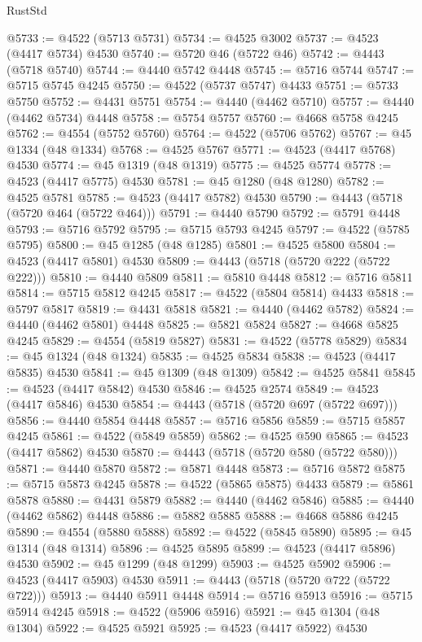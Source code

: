 \begin{lexlean}{RustStd}
\begin{coremodule}
{\begin{coremodule}
{{{{{{{{{{{{{{{{{{{{{{{{{{{{{{{{{{{{{{{{{{{{{{{{{{{{{{{{{{{{@5733 := @4522 (@5713 @5731)
@5734 := @4525 @3002
@5737 := @4523 (@4417 @5734) @4530
@5740 := @5720 @46 (@5722 @46)
@5742 := @4443 (@5718 @5740)
@5744 := @4440 @5742 @4448
@5745 := @5716 @5744
@5747 := @5715 @5745 @4245
@5750 := @4522 (@5737 @5747) @4433
@5751 := @5733 @5750
@5752 := @4431 @5751
@5754 := @4440 (@4462 @5710)
@5757 := @4440 (@4462 @5734) @4448
@5758 := @5754 @5757
@5760 := @4668 @5758 @4245
@5762 := @4554 (@5752 @5760)
@5764 := @4522 (@5706 @5762)
@5767 := @45 @1334 (@48 @1334)
@5768 := @4525 @5767
@5771 := @4523 (@4417 @5768) @4530
@5774 := @45 @1319 (@48 @1319)
@5775 := @4525 @5774
@5778 := @4523 (@4417 @5775) @4530
@5781 := @45 @1280 (@48 @1280)
@5782 := @4525 @5781
@5785 := @4523 (@4417 @5782) @4530
@5790 := @4443 (@5718 (@5720 @464 (@5722 @464)))
@5791 := @4440 @5790
@5792 := @5791 @4448
@5793 := @5716 @5792
@5795 := @5715 @5793 @4245
@5797 := @4522 (@5785 @5795)
@5800 := @45 @1285 (@48 @1285)
@5801 := @4525 @5800
@5804 := @4523 (@4417 @5801) @4530
@5809 := @4443 (@5718 (@5720 @222 (@5722 @222)))
@5810 := @4440 @5809
@5811 := @5810 @4448
@5812 := @5716 @5811
@5814 := @5715 @5812 @4245
@5817 := @4522 (@5804 @5814) @4433
@5818 := @5797 @5817
@5819 := @4431 @5818
@5821 := @4440 (@4462 @5782)
@5824 := @4440 (@4462 @5801) @4448
@5825 := @5821 @5824
@5827 := @4668 @5825 @4245
@5829 := @4554 (@5819 @5827)
@5831 := @4522 (@5778 @5829)
@5834 := @45 @1324 (@48 @1324)
@5835 := @4525 @5834
@5838 := @4523 (@4417 @5835) @4530
@5841 := @45 @1309 (@48 @1309)
@5842 := @4525 @5841
@5845 := @4523 (@4417 @5842) @4530
@5846 := @4525 @2574
@5849 := @4523 (@4417 @5846) @4530
@5854 := @4443 (@5718 (@5720 @697 (@5722 @697)))
@5856 := @4440 @5854 @4448
@5857 := @5716 @5856
@5859 := @5715 @5857 @4245
@5861 := @4522 (@5849 @5859)
@5862 := @4525 @590
@5865 := @4523 (@4417 @5862) @4530
@5870 := @4443 (@5718 (@5720 @580 (@5722 @580)))
@5871 := @4440 @5870
@5872 := @5871 @4448
@5873 := @5716 @5872
@5875 := @5715 @5873 @4245
@5878 := @4522 (@5865 @5875) @4433
@5879 := @5861 @5878
@5880 := @4431 @5879
@5882 := @4440 (@4462 @5846)
@5885 := @4440 (@4462 @5862) @4448
@5886 := @5882 @5885
@5888 := @4668 @5886 @4245
@5890 := @4554 (@5880 @5888)
@5892 := @4522 (@5845 @5890)
@5895 := @45 @1314 (@48 @1314)
@5896 := @4525 @5895
@5899 := @4523 (@4417 @5896) @4530
@5902 := @45 @1299 (@48 @1299)
@5903 := @4525 @5902
@5906 := @4523 (@4417 @5903) @4530
@5911 := @4443 (@5718 (@5720 @722 (@5722 @722)))
@5913 := @4440 @5911 @4448
@5914 := @5716 @5913
@5916 := @5715 @5914 @4245
@5918 := @4522 (@5906 @5916)
@5921 := @45 @1304 (@48 @1304)
@5922 := @4525 @5921
@5925 := @4523 (@4417 @5922) @4530
}}}}}}}}}}}}}}}}}}}}}}}}}}}}}}}}}}}}}}}}}}}}}}}}}}}}}}}}}}}}
\end{coremodule}}
\end{coremodule}
\end{lexlean}
